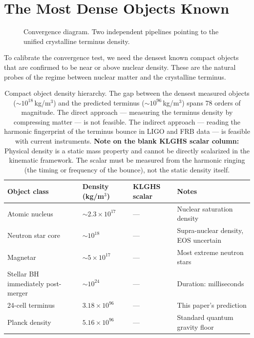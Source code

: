\documentclass[11pt, letterpaper, openany]{book}
\begin{document}
\section{The Most Dense Objects Known}

\begin{figure}[H]
\centering
{}
\caption{Convergence diagram. Two independent pipelines pointing to the unified crystalline terminus density.}
\end{figure}

To calibrate the convergence test, we need the densest known compact objects
that are confirmed to be near or above nuclear density. These are the
natural probes of the regime between nuclear matter and the crystalline
terminus.



\begin{table}[H]
\centering
\renewcommand{\arraystretch}{1.5}
\small
\begin{tabular}{|l|l|l|p{5cm}|}
\hline
\rowcolor{kishblue!10}
\textbf{Object class} & \textbf{Density (kg/m$^3$)} & \textbf{KLGHS scalar} & \textbf{Notes} \\
\hline\hline
Atomic nucleus & $\sim 2.3 \times 10^{17}$ & — & Nuclear saturation density \\
Neutron star core & $\sim 10^{18}$ & — & Supra-nuclear density, EOS uncertain \\
Magnetar & $\sim 5 \times 10^{17}$ & — & Most extreme neutron stars \\
Stellar BH immediately post-merger & $\sim 10^{24}$ & — & Duration: milliseconds \\
24-cell terminus & $3.18 \times 10^{96}$ & — & This paper's prediction \\
Planck density & $5.16 \times 10^{96}$ & — & Standard quantum gravity floor \\
\hline
\end{tabular}
\caption{Compact object density hierarchy.
The gap between the densest measured objects ($\sim 10^{18}$\,kg/m$^3$) and the predicted terminus
($\sim 10^{96}$\,kg/m$^3$) spans 78 orders of magnitude.
The direct approach --- measuring the terminus density by compressing matter --- is
not feasible.
The indirect approach --- reading the harmonic fingerprint
of the terminus bounce in LIGO and FRB data --- is feasible with current
instruments. \textbf{Note on the blank KLGHS scalar column:} Physical density is a static mass property and cannot be directly scalarized in the kinematic framework. The scalar must be measured from the harmonic ringing (the timing or frequency of the bounce), not the static density itself.}
\end{table}
\end{document}
